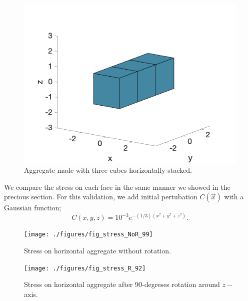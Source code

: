 \begin{figure}[h]
\begin{center}
			\includegraphics[scale=0.38]{./figures/fig_NC3_hor92}		
    	\caption{Aggregate made with three cubes horizontally stacked.}
    	\label{fig_NC3_hor_92}
    \end{center}
\end{figure}
We compare the stress on each face in the same manner we showed in the precious section.
For this validation, we add initial pertubation $C(\vec{x})$ with a Gaussian function;
\[
C(x,y,z) =  10^{-3} e^{-(1/3)\left(x^2 + y^2 + z^2\right)}.
\]
\clearpage
    \begin{figure}
    	\begin{center}
			\texttt{[image: ./figures/fig\_stress\_NoR\_99]}
    	\caption{Stress on horizontal aggregate without rotation.}
    	\label{fig_stress_NoR_99}
    \end{center}
    \end{figure}
    \begin{figure}
    	\begin{center}
			\texttt{[image: ./figures/fig\_stress\_R\_92]}
    	\caption{Stress on horizontal aggregate after 90-degreses rotation around $z-$ axis.}
    	\label{fig_stress_R_92}
    \end{center}
    \end{figure}

\clearpage
